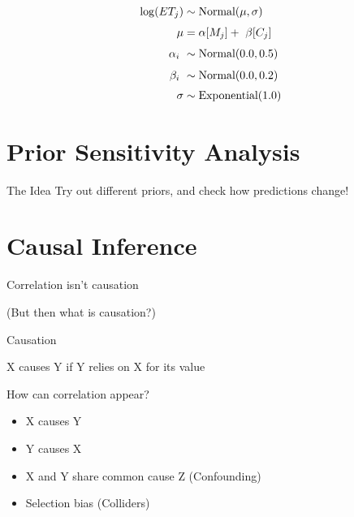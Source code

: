 \documentclass[aspectratio=169,xcolor=svgnames]{beamer}
\begin{document}
\begin{frame}
  \begin{align*}
    \log(ET_j) &\sim \text{Normal}(\mu, \sigma)\\
    \mu &= \alpha[M_j] + \markmath{arrayaccess}{\beta[C_j]}\\
    \markmath{alpha}{\alpha_i} &\sim \text{Normal}(0.0, 0.5)\\
    \markmath{beta}{\beta_i} &\sim \text{Normal}(0.0, 0.2)\\
    \sigma &\sim \text{Exponential}(1.0)\\
  \end{align*}

\end{frame}

\section{Prior Sensitivity Analysis}

\begin{frame}{The Idea}
  \center
  Try out different priors, and check how predictions change!
\end{frame}

\section{Causal Inference}

\begin{frame}
  \center
  \huge
  Correlation isn't causation

  \footnotesize
  (But then what is causation?)
\end{frame}

\begin{frame}
  \center
  \huge
  Causation

  \small
  X causes Y if Y relies on X for its value
\end{frame}

\begin{frame}
  How can correlation appear?
  \begin{itemize}
  \item X causes Y
  \item Y causes X
  \item X and Y share common cause Z (Confounding)
  \item Selection bias (Colliders)
  \end{itemize}
\end{frame}
\end{document}
